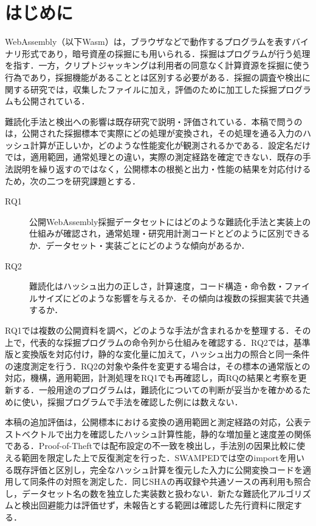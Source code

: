 \documentclass[submit,techrep]{ipsj}
\begin{document}
\section{はじめに}
WebAssembly（以下Wasm）は，ブラウザなどで動作するプログラムを表すバイナリ形式であり\cite{webassembly}，暗号資産の採掘にも用いられる．採掘はプログラムが行う処理を指す．一方，クリプトジャッキングは利用者の同意なく計算資源を採掘に使う行為であり，採掘機能があることとは区別する必要がある．採掘の調査や検出に関する研究では，収集したファイルに加え，評価のために加工した採掘プログラムも公開されている\cite{konoth2018,harnes2024,kim2025}．

難読化手法と検出への影響は既存研究で説明・評価されている\cite{harnes2024,cabrera2023,cao2023}．本稿で問うのは，公開された採掘標本で実際にどの処理が変換され，その処理を通る入力のハッシュ計算が正しいか，どのような性能変化が観測されるかである．設定名だけでは，適用範囲，通常処理との違い，実際の測定経路を確定できない．既存の手法説明を繰り返すのではなく，公開標本の根拠と出力・性能の結果を対応付けるため，次の二つを研究課題とする．
\begin{description}
\item[RQ1] 公開WebAssembly採掘データセットにはどのような難読化手法と実装上の仕組みが確認され，通常処理・研究用計測コードとどのように区別できるか．データセット・実装ごとにどのような傾向があるか．
\item[RQ2] 難読化はハッシュ出力の正しさ，計算速度，コード構造・命令数・ファイルサイズにどのような影響を与えるか．その傾向は複数の採掘実装で共通するか．
\end{description}
RQ1では複数の公開資料を調べ，どのような手法が含まれるかを整理する．その上で，代表的な採掘プログラムの命令列から仕組みを確認する．RQ2では，基準版と変換版を対応付け，静的な変化量に加えて，ハッシュ出力の照合と同一条件の速度測定を行う．RQ2の対象や条件を変更する場合は，その標本の通常版との対応，機構，適用範囲，計測処理をRQ1でも再確認し，両RQの結果と考察を更新する．一般用途のプログラムは，難読化についての判断が妥当かを確かめるために使い，採掘プログラムで手法を確認した例には数えない．

本稿の追加評価は，公開標本における変換の適用範囲と測定経路の対応，公表テストベクトルで出力を確認したハッシュ計算性能，静的な増加量と速度差の関係である．Proof-of-Theftでは配布設定の不一致を検出し，手法別の因果比較に使える範囲を限定した上で反復測定を行った．SWAMPEDでは空のimportを用いる既存評価と区別し，完全なハッシュ計算を復元した入力に公開変換コードを適用して同条件の対照を測定した．同じSHAの再収録や共通ソースの再利用も照合し，データセット名の数を独立した実装数と扱わない．新たな難読化アルゴリズムと検出回避能力は評価せず，未報告とする範囲は確認した先行資料に限定する．
\end{document}
